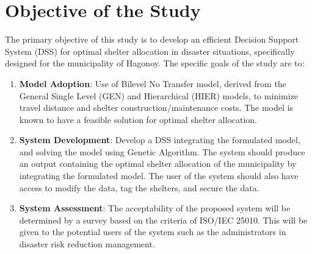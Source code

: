 \section{Objective of the Study}

The primary objective of this study is to develop an efficient Decision Support System (DSS) for optimal shelter allocation in disaster situations, specifically designed for the municipality of Hagonoy. The specific goals of the study are to:

\begin{enumerate}
	\item \textbf{Model Adoption}: Use of Bilevel No Transfer model, derived from the General Single Level (GEN) and Hierarchical (HIER) models, to minimize travel distance and shelter construction/maintenance costs. The model is known to have a feasible solution for optimal shelter allocation.
	
	\item \textbf{System Development}: Develop a DSS integrating the formulated model, and solving the model using Genetic Algorithm. The system should produce an output containing the optimal shelter allocation of the municipality by integrating the formulated model. The user of the system should also have access to modify the data, tag the shelters, and secure the data.
	
	\item \textbf{System Assessment}: The acceptability of the proposed system will be determined by a survey based on the criteria of ISO/IEC 25010. This will be given to the potential users of the system such as the administrators in disaster risk reduction management.
	
	
\end{enumerate}